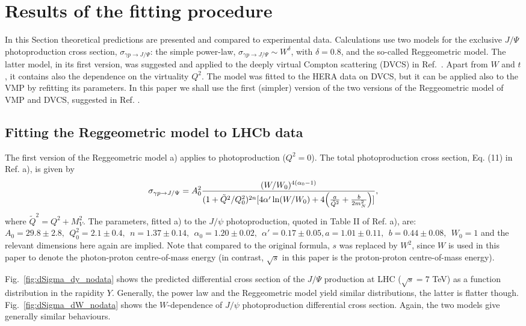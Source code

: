 \documentclass[12pt]{article}
\begin{document}
\section{Results of the fitting procedure}

In this Section theoretical predictions are presented and compared to experimental data.
Calculations use two models for the exclusive $J/\Psi$ photoproduction cross section, $\sigma_{\gamma p \to J/\Psi}$:
the simple power-law, $\sigma_{\gamma p \to J/\Psi}\sim W^\delta$, with $\delta=0.8$, and the so-called Reggeometric model.
The latter model, in its first version, was suggested and applied to the deeply virtual Compton scattering (DVCS) in Ref.~\cite{Capua}.
Apart from $W$ and $t$, it contains also the dependence on the virtuality $Q^2$.
The model was fitted to the HERA data on DVCS, but it can be applied also to the VMP by refitting its parameters.
In this paper we shall use the first (simpler) version of the two versions of the Reggeometric model of VMP and DVCS, suggested in Ref. \cite{FFJS}.

\subsection{Fitting the  Reggeometric model to LHCb data}

The first version of the Reggeometric model \cite{FFJS} a) applies to photoproduction ($Q^2=0$). The total photoproduction cross section, Eq. (11) in Ref. \cite{FFJS} a), is given by 
\begin{equation}
\sigma_{\gamma p \to J/\Psi}=A_0^2\frac{(W/W_0)^{4(\alpha_0-1)}}{(1+\tilde Q^2/Q^2_0)^{2n}[4\alpha'\ln(W/W_0)+4\Bigl(\frac{a}{\tilde Q^2}+\frac{b}{2m_N^2}\Bigr)]},
\end{equation}
where $\widetilde Q^2=Q^2+M_V^2$. The parameters, fitted \cite{FFJS} a) to the $J/\psi$ photoproduction, quoted in
Table II of Ref. \cite{FFJS} a), are: $A_0=29.8\pm 2.8,\ \ Q_0^2=2.1\pm 0.4,\ \
n=1.37\pm 0.14,\ \ \alpha_0 =1.20\pm 0.02,\ \ \alpha'=0.17\pm 0.05, a=1.01\pm 0.11,\ \ b=0.44\pm 0.08,\ \ W_0=1$ and the relevant dimensions here again are implied.
Note that compared to the original formula, $s$ was replaced by $W^2$, since $W$ is used in this paper to 
denote the photon-proton centre-of-mass energy (in contrast, $\sqrt{s}$ in this paper is the proton-proton centre-of-mass energy).

Fig.~\ref{fig:dSigma_dy_nodata} shows the predicted differential cross section of the $J/\Psi$ production at LHC ($\sqrt s=7$ TeV) as a function distribution in the rapidity $Y$.
Generally, the power law and the Reggeometric model yield similar distributions,  the latter is flatter though.
Fig.~\ref{fig:dSigma_dW_nodata} shows the $W$-dependence of $J/\psi$ photoproduction differential cross section.
Again, the two models give generally similar behaviours.
\newpage
\end{document}
